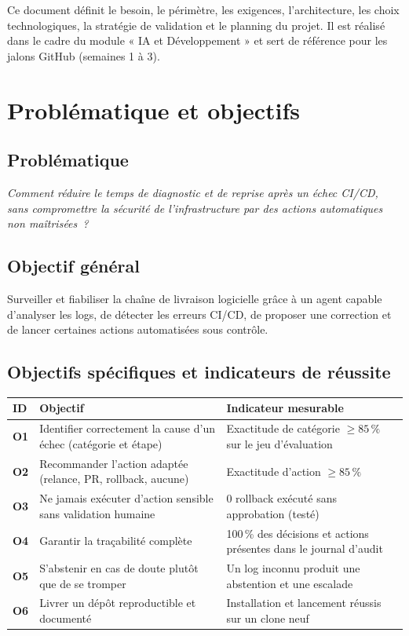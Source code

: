\documentclass[11pt,a4paper]{article}
\begin{document}
Ce document définit le besoin, le périmètre, les exigences, l'architecture, les choix
technologiques, la stratégie de validation et le planning du projet. Il est réalisé dans le
cadre du module « IA et Développement » et sert de référence pour les jalons GitHub (semaines 1 à 3).

\section{Problématique et objectifs}
\subsection{Problématique}
\emph{Comment réduire le temps de diagnostic et de reprise après un échec CI/CD, sans
compromettre la sécurité de l'infrastructure par des actions automatiques non maîtrisées~?}

\subsection{Objectif général}
Surveiller et fiabiliser la chaîne de livraison logicielle grâce à un agent capable d'analyser les
logs, de détecter les erreurs CI/CD, de proposer une correction et de lancer certaines actions
automatisées sous contrôle.

\subsection{Objectifs spécifiques et indicateurs de réussite}
\begin{longtable}{>{\bfseries}p{1.2cm}p{7.3cm}p{6cm}}
\toprule
\textbf{ID} & \textbf{Objectif} & \textbf{Indicateur mesurable} \\
\midrule\endhead
O1 & Identifier correctement la cause d'un échec (catégorie et étape) & Exactitude de catégorie $\geq 85\,\%$ sur le jeu d'évaluation \\
O2 & Recommander l'action adaptée (relance, PR, rollback, aucune) & Exactitude d'action $\geq 85\,\%$ \\
O3 & Ne jamais exécuter d'action sensible sans validation humaine & 0 rollback exécuté sans approbation (testé) \\
O4 & Garantir la traçabilité complète & 100\,\% des décisions et actions présentes dans le journal d'audit \\
O5 & S'abstenir en cas de doute plutôt que de se tromper & Un log inconnu produit une abstention et une escalade \\
O6 & Livrer un dépôt reproductible et documenté & Installation et lancement réussis sur un clone neuf \\
\bottomrule
\end{longtable}
\end{document}
